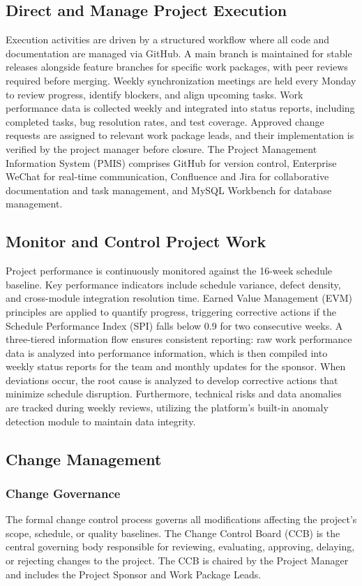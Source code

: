 \documentclass[12pt,a4paper]{article}
\begin{document}
\subsection{Direct and Manage Project Execution}
Execution activities are driven by a structured workflow where all code and documentation are managed via GitHub. A main branch is maintained for stable releases alongside feature branches for specific work packages, with peer reviews required before merging. Weekly synchronization meetings are held every Monday to review progress, identify blockers, and align upcoming tasks. Work performance data is collected weekly and integrated into status reports, including completed tasks, bug resolution rates, and test coverage. Approved change requests are assigned to relevant work package leads, and their implementation is verified by the project manager before closure. The Project Management Information System (PMIS) comprises GitHub for version control, Enterprise WeChat for real-time communication, Confluence and Jira for collaborative documentation and task management, and MySQL Workbench for database management.

\subsection{Monitor and Control Project Work}
Project performance is continuously monitored against the 16-week schedule baseline. Key performance indicators include schedule variance, defect density, and cross-module integration resolution time. Earned Value Management (EVM) principles are applied to quantify progress, triggering corrective actions if the Schedule Performance Index (SPI) falls below 0.9 for two consecutive weeks. A three-tiered information flow ensures consistent reporting: raw work performance data is analyzed into performance information, which is then compiled into weekly status reports for the team and monthly updates for the sponsor. When deviations occur, the root cause is analyzed to develop corrective actions that minimize schedule disruption. Furthermore, technical risks and data anomalies are tracked during weekly reviews, utilizing the platform's built-in anomaly detection module to maintain data integrity.

\subsection{Change Management}

\subsubsection{Change Governance}
The formal change control process governs all modifications affecting the project's scope, schedule, or quality baselines. The Change Control Board (CCB) is the central governing body responsible for reviewing, evaluating, approving, delaying, or rejecting changes to the project. The CCB is chaired by the Project Manager and includes the Project Sponsor and Work Package Leads.
\end{document}
